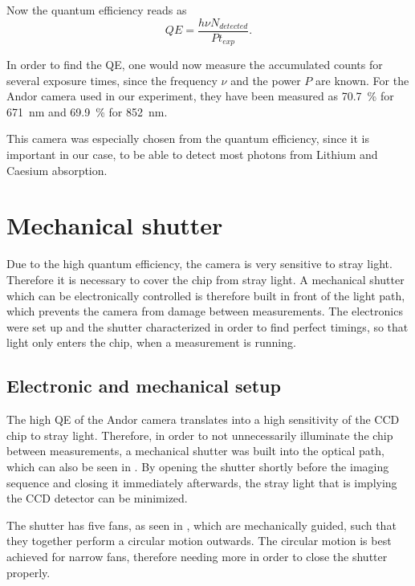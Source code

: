 Now the quantum efficiency reads as
\begin{equation}
QE = \frac{h \nu N_{detected}}{P t_{exp}}.
\end{equation}

In order to find the QE, one would now measure the accumulated counts for several exposure times, since the frequency $\nu$ and the power $P$ are known. For the Andor camera used in our experiment, they have been measured as \SI{70.7}{\percent} for \SI{671}{\nano\meter} and \SI{69.9}{\percent} for \SI{852}{\nano\meter}.

This camera was especially chosen from the quantum efficiency, since it is important in our case, to be able to detect most photons from Lithium and Caesium absorption.

\section{Mechanical shutter}
\label{sec:shutter}

Due to the high quantum efficiency, the camera is very sensitive to stray light. Therefore it is necessary to cover the chip from stray light. A mechanical shutter which can be electronically controlled is therefore built in front of the light path, which prevents the camera from damage between measurements. The electronics were set up and the shutter characterized in order to find perfect timings, so that light only enters the chip, when a measurement is running.

\subsection{Electronic and mechanical setup}
\label{subsec:shutter_electronic}

The high QE of the Andor camera translates into a high sensitivity of the CCD chip to stray light. Therefore, in order to not unnecessarily illuminate the chip between measurements, a mechanical shutter was built into the optical path, which can also be seen in . By opening the shutter shortly before the imaging sequence and closing it immediately afterwards, the stray light that is implying the CCD detector can be minimized.

The shutter has five fans, as seen in , which are mechanically guided, such that they together perform a circular motion outwards. The circular motion is best achieved for narrow fans, therefore needing more in order to close the shutter properly.

